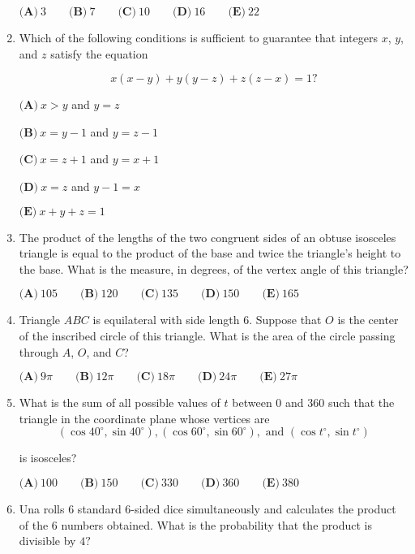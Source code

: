 \documentclass{article}
\begin{document}
\begin{enumerate}[label=\arabic*., itemsep=0.5em]
$\textbf{(A)} \: 3\qquad\textbf{(B)} \: 7\qquad\textbf{(C)} \: 10\qquad\textbf{(D)} \: 16\qquad\textbf{(E)} \: 22$\par \vspace{0.5em}\item Which of the following conditions is sufficient to guarantee that integers $x$, $y$, and $z$ satisfy the equation

\begin{equation*}
x(x-y)+y(y-z)+z(z-x) = 1?
\end{equation*}


$\textbf{(A)} \: x>y$ and $y=z$

$\textbf{(B)} \: x=y-1$ and $y=z-1$

$\textbf{(C)} \: x=z+1$ and $y=x+1$

$\textbf{(D)} \: x=z$ and $y-1=x$

$\textbf{(E)} \: x+y+z=1$\par \vspace{0.5em}\item The product of the lengths of the two congruent sides of an obtuse isosceles triangle is equal to the product of the base and twice the triangle's height to the base. What is the measure, in degrees, of the vertex angle of this triangle?

$\textbf{(A)} \: 105 \qquad\textbf{(B)} \: 120 \qquad\textbf{(C)} \: 135 \qquad\textbf{(D)} \: 150 \qquad\textbf{(E)} \: 165$\par \vspace{0.5em}\item Triangle $ABC$ is equilateral with side length $6$. Suppose that $O$ is the center of the inscribed
circle of this triangle. What is the area of the circle passing through $A$, $O$, and $C$?

$\textbf{(A)} \: 9\pi \qquad\textbf{(B)} \: 12\pi \qquad\textbf{(C)} \: 18\pi \qquad\textbf{(D)} \: 24\pi \qquad\textbf{(E)} \: 27\pi$\par \vspace{0.5em}\item What is the sum of all possible values of $t$ between $0$ and $360$ such that the triangle in the coordinate plane whose vertices are 
\begin{equation*}
(\cos 40^\circ,\sin 40^\circ), (\cos 60^\circ,\sin 60^\circ), \text{ and } (\cos t^\circ,\sin t^\circ)
\end{equation*}

is isosceles? 

$\textbf{(A)} \: 100 \qquad\textbf{(B)} \: 150 \qquad\textbf{(C)} \: 330 \qquad\textbf{(D)} \: 360 \qquad\textbf{(E)} \: 380$\par \vspace{0.5em}\item Una rolls $6$ standard $6$-sided dice simultaneously and calculates the product of the $6{ }$ numbers obtained. What is the probability that the product is divisible by $4?$


\end{enumerate}
\end{document}
